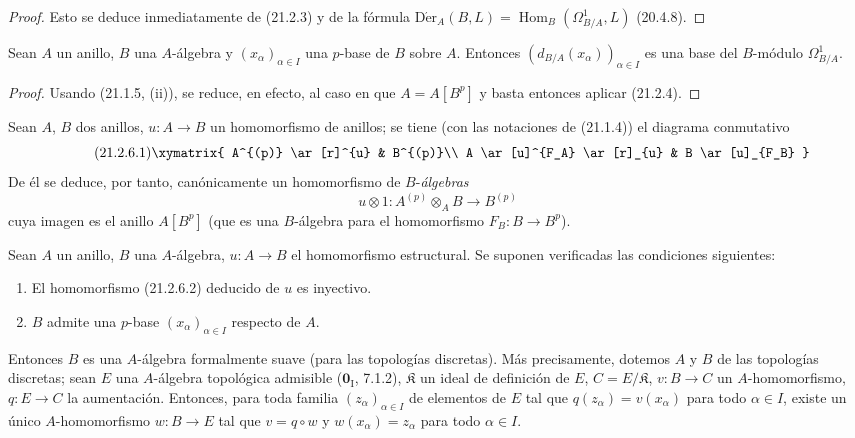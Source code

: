 \begin{proof}
Esto se deduce inmediatamente de (21.2.3) y de la fórmula
$\operatorname{D\acute{e}r}_A(B,L)=\operatorname{Hom}_B(\Omega^1_{B/A},L)$ (20.4.8).
\end{proof}

\begin{corollary}[21.2.5]
\label{0.21.2.5-fr}
Sean $A$ un anillo, $B$ una $A$-álgebra y $(x_\alpha)_{\alpha\in I}$ una
$p$-base de $B$ sobre $A$. Entonces $(d_{B/A}(x_\alpha))_{\alpha\in I}$ es
una base del $B$-módulo $\Omega^1_{B/A}$.
\end{corollary}

\begin{proof}
Usando (21.1.5, (ii)), se reduce, en efecto, al caso en que $A=A[B^p]$ y basta
entonces aplicar (21.2.4).
\end{proof}

\begin{env}[21.2.6]
\label{0.21.2.6-fr}
Sean $A$, $B$ dos anillos, $u:A\to B$ un homomorfismo de anillos; se tiene
(con las notaciones de (21.1.4)) el diagrama conmutativo
\begin{equation}
\tag{21.2.6.1}
\label{0.21.2.6.1-fr}
\xymatrix{
 A^{(p)} \ar[r]^{u} & B^{(p)}\\
 A \ar[u]^{F_A} \ar[r]_{u} & B \ar[u]_{F_B}
}
\end{equation}
De él se deduce, por tanto, canónicamente un homomorfismo de $B$-\emph{álgebras}
\begin{equation}
\tag{21.2.6.2}
\label{0.21.2.6.2-fr}
u\otimes1:A^{(p)}\otimes_A B\longrightarrow B^{(p)}
\end{equation}
cuya imagen es el anillo $A[B^p]$ (que es una $B$-álgebra para el
homomorfismo $F_B:B\to B^p$).
\end{env}

\begin{theorem}[21.2.7]
\label{0.21.2.7-fr}
Sean $A$ un anillo, $B$ una $A$-álgebra, $u:A\to B$ el homomorfismo
estructural. Se suponen verificadas las condiciones siguientes:
\begin{enumerate}
  \item[\textup{(i)}] El homomorfismo \textup{(21.2.6.2)} deducido de $u$ es inyectivo.
  \item[\textup{(ii)}] $B$ admite una $p$-base $(x_\alpha)_{\alpha\in I}$ respecto de
  $A$.
\end{enumerate}
Entonces $B$ es una $A$-álgebra formalmente suave (para las topologías
discretas). Más precisamente, dotemos $A$ y $B$ de las topologías discretas;
sean $E$ una $A$-álgebra topológica admisible \textup{($\mathbf{0}_{\mathrm I}$, 7.1.2)},
$\mathfrak K$ un ideal de definición de $E$, $C=E/\mathfrak K$,
$v:B\to C$ un $A$-homomorfismo, $q:E\to C$ la aumentación. Entonces, para
toda familia $(z_\alpha)_{\alpha\in I}$ de elementos de $E$ tal que
$q(z_\alpha)=v(x_\alpha)$ para todo $\alpha\in I$, existe un único
$A$-homomorfismo $w:B\to E$ tal que $v=q\circ w$ y
$w(x_\alpha)=z_\alpha$ para todo $\alpha\in I$.
\end{theorem}

